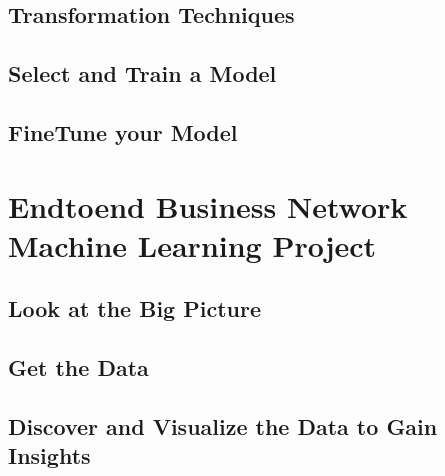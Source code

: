\documentclass[letterpaper,10pt,english]{jupyterBook}
\begin{document}
\section{Transformation Techniques}
\label{\detokenize{foundations/ch2/transformation-techniques:transformation-techniques}}\label{\detokenize{foundations/ch2/transformation-techniques::doc}}

\section{Select and Train a Model}
\label{\detokenize{foundations/ch2/select-and-train:select-and-train-a-model}}\label{\detokenize{foundations/ch2/select-and-train::doc}}

\section{Fine\sphinxhyphen{}Tune your Model}
\label{\detokenize{foundations/ch2/fine-tune:fine-tune-your-model}}\label{\detokenize{foundations/ch2/fine-tune::doc}}

\chapter{End\sphinxhyphen{}to\sphinxhyphen{}end Business Network Machine Learning Project}
\label{\detokenize{foundations/ch3/ch3:end-to-end-business-network-machine-learning-project}}\label{\detokenize{foundations/ch3/ch3::doc}}

\section{Look at the Big Picture}
\label{\detokenize{foundations/ch3/big-picture:look-at-the-big-picture}}\label{\detokenize{foundations/ch3/big-picture::doc}}

\section{Get the Data}
\label{\detokenize{foundations/ch3/get-the-data:get-the-data}}\label{\detokenize{foundations/ch3/get-the-data::doc}}

\section{Discover and Visualize the Data to Gain Insights}
\label{\detokenize{foundations/ch3/discover-and-visualize:discover-and-visualize-the-data-to-gain-insights}}\label{\detokenize{foundations/ch3/discover-and-visualize::doc}}
\end{document}
